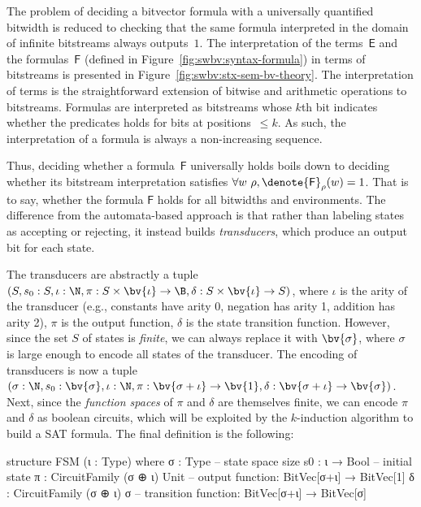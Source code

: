 The problem of deciding a bitvector formula with a universally quantified
bitwidth is reduced to checking that the same formula interpreted in the domain
of infinite bitstreams always outputs~$1$.
%
The interpretation of the terms~$\mathsf E$ and
the formulas~$\mathsf F$ (defined in Figure~\ref{fig:swbv:syntax-formula}) in terms
of bitstreams is presented in Figure~\ref{fig:swbv:stx-sem-bv-theory}.
%
The interpretation of terms is the straightforward extension of bitwise and
arithmetic operations to bitstreams. Formulas are interpreted as bitstreams
whose $k$th bit indicates whether the predicates holds for bits at
positions~$\leq k$.
%
As such, the interpretation of a formula is always a non-increasing sequence.

Thus, deciding whether a formula~$\mathsf F$ universally holds boils down to
deciding whether its bitstream interpretation satisfies $\forall w~\rho,
\denote{\mathsf F}_\rho(w) = 1$.
%
That is to say, whether the formula $\mathsf F$ holds for all bitwidths and
environments. The difference from the automata-based approach is that rather
than labeling states as accepting or rejecting, it instead builds
\emph{transducers}, which produce an output bit for each state.

The transducers are abstractly a tuple $(S, s_0 : S, \iota : \N, \pi : S \times
\bv{\iota} \to \B, \delta : S \times \bv{\iota} \to S)$, where $\iota$ is the
arity of the transducer (e.g., constants have arity 0, negation has arity 1,
addition has arity 2), $\pi$ is the output function, $\delta$ is the state
transition function. However, since the set $S$ of states is \emph{finite}, we
can always replace it with $\bv{\sigma}$, where $\sigma$ is large enough to
encode all states of the transducer.
%
The encoding of transducers is now a tuple $(\sigma : \N, s_0 :
\bv{\sigma}, \iota : \N, \pi : \bv{\sigma+\iota} \to \bv{1}, \delta :
\bv{\sigma+\iota} \to \bv{\sigma})$.
%
Next, since the \emph{function spaces} of $\pi$ and $\delta$ are themselves
finite, we can encode $\pi$ and $\delta$ as boolean circuits, which will be
exploited by the $k$-induction algorithm to build a SAT formula.
%
The final definition is the following:
%
\begin{lean}
structure FSM (ι  : Type) where
  σ  : Type  -- state space size
  s0 : ι → Bool -- initial state
  π  : CircuitFamily (σ ⊕ ι) Unit -- output function: BitVec[σ+ι] → BitVec[1]
  δ  : CircuitFamily (σ ⊕ ι) σ -- transition function: BitVec[σ+ι] → BitVec[σ]
\end{lean}


